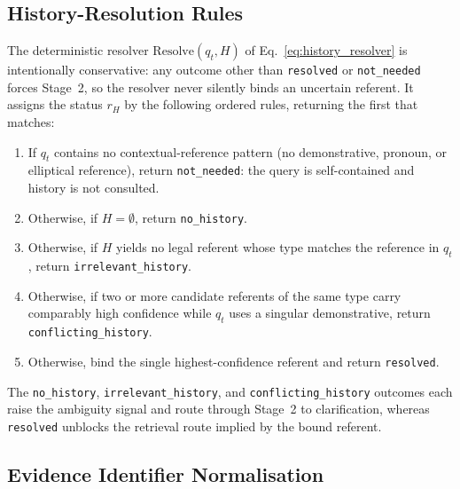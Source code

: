 \documentclass[pdflatex,sn-mathphys-num]{sn-jnl}
\begin{document}
\subsection{History-Resolution Rules}\label{app:resolver}

The deterministic resolver $\mathrm{Resolve}(q_t,H)$ of
Eq.~\eqref{eq:history_resolver} is intentionally conservative: any outcome
other than \texttt{resolved} or \texttt{not\_needed} forces Stage~2, so the
resolver never silently binds an uncertain referent. It assigns the status
$r_H$ by the following ordered rules, returning the first that matches:
\begin{enumerate}
\item If $q_t$ contains no contextual-reference pattern (no demonstrative,
      pronoun, or elliptical reference), return \texttt{not\_needed}: the
      query is self-contained and history is not consulted.
\item Otherwise, if $H=\emptyset$, return \texttt{no\_history}.
\item Otherwise, if $H$ yields no legal referent whose type matches the
      reference in $q_t$, return \texttt{irrelevant\_history}.
\item Otherwise, if two or more candidate referents of the same type carry
      comparably high confidence while $q_t$ uses a singular demonstrative,
      return \texttt{conflicting\_history}.
\item Otherwise, bind the single highest-confidence referent and return
      \texttt{resolved}.
\end{enumerate}
The \texttt{no\_history}, \texttt{irrelevant\_history}, and
\texttt{conflicting\_history} outcomes each raise the ambiguity signal and
route through Stage~2 to clarification, whereas \texttt{resolved} unblocks the
retrieval route implied by the bound referent.

\subsection{Evidence Identifier Normalisation}\label{app:idnorm}
\end{document}
